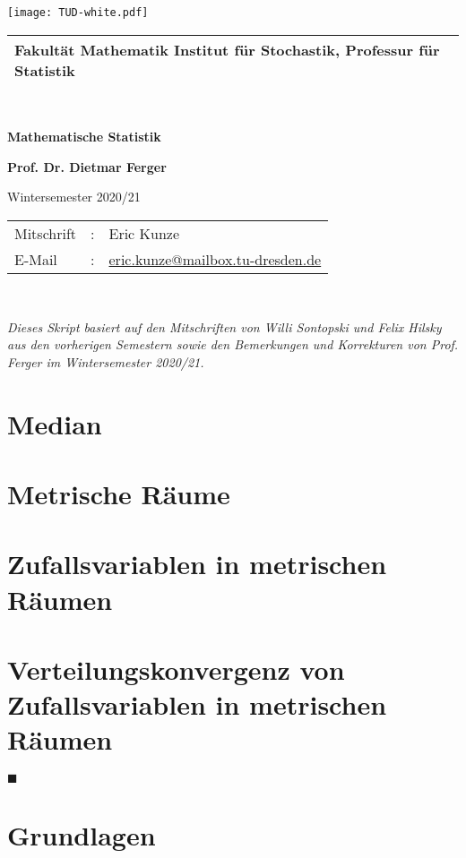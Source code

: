 \documentclass[ngerman, a4paper, 11pt]{report}
\makeatletter
\newcommand{\makeTUtitle}[1][]{%
    \begin{titlepage}
        \pagecolor{cddarkblue!90}
        \color{white}

        \raggedright
        \fosfamily
        \setlength{\parindent}{0pt}

        \hspace{-18.6mm} %
        \texttt{[image: TUD-white.pdf]} \\

        \vspace{3mm}
        \begin{tabular}{m{\textwidth}}
            \hline
            \hspace{-4pt}\small{\textbf{Fakultät Mathematik} Institut für Stochastik, Professur für Statistik} \\
            \hline
        \end{tabular} \\

        \vspace{5cm}
        {\Huge\bfseries \MakeUppercase Mathematische Statistik \par}
        \ifthenelse{\isempty{#1}}{}{
            \vspace{0.5cm}%
            {\Large \itshape #1} \\%
        }
        \vspace{1.5cm}
        \textbf{{\Large Prof. Dr. Dietmar Ferger}} \par
        \vspace{0.5cm}
        {\large Wintersemester 2020/21}

        \vfill
        \begin{tabular}{lll}
            Mitschrift  & : & Eric Kunze \\
            E-Mail      & : & \url{eric.kunze@mailbox.tu-dresden.de} \\
        \end{tabular}
    \end{titlepage}
    \nopagecolor
}
\theoremstyle{plain}
\theoremstyle{plain}
\theoremstyle{plain}
\theoremstyle{nonumberplain}
\theoremstyle{proofstyle}
\makeatother
\begin{document}
    \makeTUtitle
    
    ~ \vfill
    \begin{center}
    	\fosfamily \itshape
    	Dieses Skript basiert auf den Mitschriften von Willi Sontopski und Felix Hilsky aus den vorherigen Semestern sowie den Bemerkungen und Korrekturen von Prof. Ferger im Wintersemester 2020/21. 
    \end{center}
	\vfill
	
	\pagebreak

    \tableofcontents

    \chapter{Median}
    \label{chapter_1_median}
    
    
    
    \chapter{Metrische Räume}
    \label{chapter_2_metrischeRaeume}
    

	\chapter{Zufallsvariablen in metrischen Räumen}
	\label{chapter_3_zufallsvariablenInMetrischenRaeumen}
	
	
	
	
	
	
	\chapter{Verteilungskonvergenz von Zufallsvariablen in metrischen Räumen}
	
	
	
    \vfill \hfill $\blacksquare$
    
    \appendix
    \chapter{Grundlagen}
    
    
    \nocite{*} %
   	
    
\end{document}
